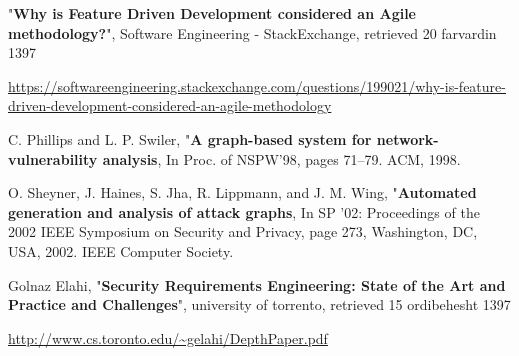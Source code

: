 \begin{thebibliography}{8}
\latin



"\textbf{Why is Feature Driven Development considered an Agile methodology?}", Software Engineering - StackExchange, retrieved 20 farvardin 1397

\url{https://softwareengineering.stackexchange.com/questions/199021/why-is-feature-driven-development-considered-an-agile-methodology}


C. Phillips and L. P. Swiler, "\textbf{A graph-based system for network-vulnerability analysis}, In Proc. of
NSPW’98, pages 71–79. ACM, 1998.



O. Sheyner, J. Haines, S. Jha, R. Lippmann, and J. M. Wing, "\textbf{Automated generation and analysis of
attack graphs}, In SP ’02: Proceedings of the 2002 IEEE Symposium on Security and Privacy, page
273, Washington, DC, USA, 2002. IEEE Computer Society.



Golnaz Elahi, "\textbf{Security Requirements Engineering: State of the Art and Practice and Challenges}", university of torrento, retrieved 15 ordibehesht 1397

\url{http://www.cs.toronto.edu/~gelahi/DepthPaper.pdf}








\end{thebibliography}




